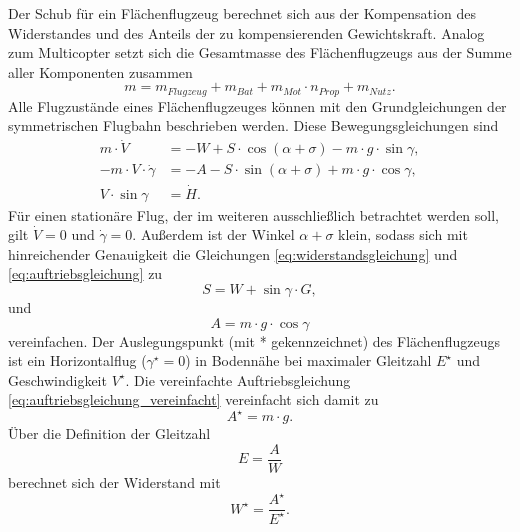 Der Schub für ein Flächenflugzeug berechnet sich aus der Kompensation des Widerstandes und des Anteils der zu kompensierenden Gewichtskraft. Analog zum Multicopter setzt sich die Gesamtmasse des Flächenflugzeugs aus der Summe aller Komponenten zusammen
\begin{equation}
	m = m_{Flugzeug}+m_{Bat}+m_{Mot}\cdot n_{Prop}+m_{Nutz}.
\end{equation}
Alle Flugzustände eines Flächenflugzeuges können mit den Grundgleichungen der symmetrischen Flugbahn beschrieben werden. Diese Bewegungsgleichungen \cite[S.77]{Bruning.1986} sind
\begin{align}
	m\cdot \dot{V} &= -W + S\cdot\cos(\alpha+\sigma)-m\cdot g\cdot\sin\gamma , \label{eq:widerstandsgleichung} \\ 
	-m\cdot V\cdot\dot{\gamma} &= -A - S\cdot\sin(\alpha+\sigma)+m\cdot g\cdot\cos\gamma , \label{eq:auftriebsgleichung} \\ 
	V\cdot\sin\gamma &= \dot{H}. \label{eq:steiggleichung}
\end{align}	
Für einen stationäre Flug, der im weiteren ausschließlich betrachtet werden soll, gilt \ensuremath{\dot{V} = 0} und \ensuremath{\dot{\gamma} = 0}. Außerdem ist der Winkel \ensuremath{\alpha + \sigma} klein, sodass sich mit hinreichender Genauigkeit die Gleichungen \ref{eq:widerstandsgleichung} und \ref{eq:auftriebsgleichung} zu
\begin{equation}
	S = W + \sin\gamma\cdot G, 
	\label{eq:widerstandsgleichung_vereinfacht}
\end{equation}
und
\begin{equation}
	A = m\cdot g\cdot\cos\gamma 
	\label{eq:auftriebsgleichung_vereinfacht}
\end{equation} 
vereinfachen. Der Auslegungspunkt (mit * gekennzeichnet) des Flächenflugzeugs ist ein Horizontalflug (\ensuremath{\gamma^\star = 0}) in Bodennähe bei maximaler Gleitzahl \ensuremath{E^\star} und Geschwindigkeit \ensuremath{V^\star}. Die vereinfachte Auftriebsgleichung \ref{eq:auftriebsgleichung_vereinfacht} vereinfacht sich damit zu
\begin{equation}
	A^\star = m\cdot g .
\end{equation}
Über die Definition der Gleitzahl \cite[S.49]{Bruning.1986}
\begin{equation}
	E = \frac{A}{W}
\end{equation}
berechnet sich der Widerstand mit
\begin{equation}
	W^\star = \frac{A^\star}{E^\star} .
\end{equation}
